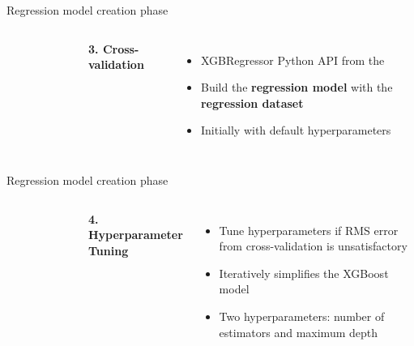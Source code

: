\begin{frame}{Regression model creation phase}
    \begin{columns}
        \vspace{-1cm}
        \begin{figure}[!ht]
            \centering
            
        \end{figure}

        
        \textbf{\textcolor{omni-spring-pastels-8}{3. Cross-validation}}
        \begin{itemize}
            \item XGBRegressor Python API from the \cite{dmlc:2014:XGBoost}
            \item Build the \textbf{regression model} with the \textbf{regression dataset}
            \item Initially with default hyperparameters
        \end{itemize}
    \end{columns}
\end{frame}

\begin{frame}{Regression model creation phase}
    \begin{columns}
        \vspace{-1cm}
        \begin{figure}[!ht]
            \centering
            
        \end{figure}

        
        \textbf{\textcolor{omni-spring-pastels-8}{4. Hyperparameter Tuning}}
        \begin{itemize}
            \item Tune hyperparameters if RMS error from cross-validation is unsatisfactory
            \item Iteratively simplifies the XGBoost model
            \item Two hyperparameters: number of estimators and maximum depth
        \end{itemize}
    \end{columns}
\end{frame}

